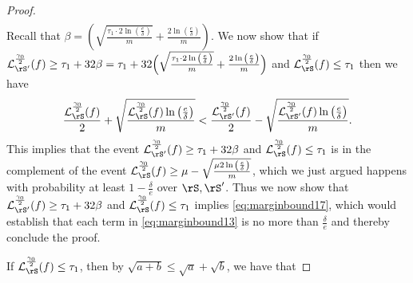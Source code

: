 \begin{proof}
\begin{align}
\end{align}
Recall that $ \beta=\left(\sqrt{\frac{\tau_{1}\cdot 2 \ln{\left(\frac{e}{\delta} \right)}}{m}} 
+\frac{2\ln{\left(\frac{e}{\delta} \right)}}{m}\right).$ We now show
that if $
\ls_{\rS'}^{\frac{\gamma_{0}}{2}}(f)\geq \tau_{1}+32\beta=\tau_{1} 
+ 32\Big(\sqrt{\frac{\tau_{1}\cdot 2 \ln{\left(\frac{e}{\delta} \right)}}{m}} 
+\frac{2\ln{\left(\frac{e}{\delta} \right)}}{m}\Big) $ and $ \ls_{\rS}^{\frac{\gamma_{0}}{2}}(f)
\leq  \tau_{1}$ then we have
\begin{align}\label{eq:marginbound17}
  \frac{\ls_{\rS}^{\frac{\gamma_{0}}{2}}(f)}{2}+
        \sqrt{\frac{
            \ls_{\rS}^{\frac{\gamma_{0}}{2}}(f)
            \ln{\left(\frac{e}{\delta} \right)}}{m}} < 
    \frac{\ls_{\rS'}^{\frac{\gamma_{0}}{2}}(f)}{2}-
    \sqrt{\frac{
       \ls_{\rS'}^{\frac{\gamma_{0}}{2}}(f)
        \ln{\left(\frac{e}{\delta} \right)}}{m}}.
        \end{align}
This implies that the event $
\ls_{\rS'}^{\frac{\gamma_{0}}{2}}(f)\geq\tau_{1}+32\beta$ and $ \ls_{\rS}^{\frac{\gamma_{0}}{2}}(f)
\leq  \tau_{1}$ is in the complement of the event $ \ls_{\rS}^{\frac{\gamma_{0}}{2}}(f)
\geq 
\mu-\sqrt{\frac{\mu 2 \ln{\left(\frac{e}{\delta} \right)}}{m}}$, which
we just argued happens with probability at least $ 1-\frac{\delta}{e}
$ over $ \rS ,\rS'$. Thus we now show that $
\ls_{\rS'}^{\frac{\gamma_{0}}{2}}(f)\geq \tau_{1} 
+ 32\beta $ and $ \ls_{\rS}^{\frac{\gamma_{0}}{2}}(f)
\leq  \tau_{1}$  implies \cref{eq:marginbound17}, which would
establish that each term in \cref{eq:marginbound13} is no more than $
\frac{\delta}{e} $ and thereby conclude the proof.

If $ \ls_{\rS}^{\frac{\gamma_{0}}{2}}(f)
\leq  \tau_{1}$,
then by $ \sqrt{a+b}\leq \sqrt{a}+\sqrt{b} $, we have that 


\end{proof}
